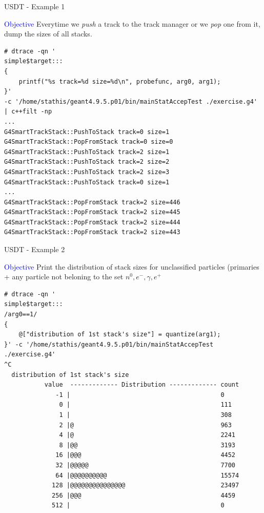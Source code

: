 \documentclass{beamer}
\begin{document}
\begin{frame}[fragile]{USDT - Example 1}
\lstset{basicstyle=\tiny\ttfamily}

\textcolor{blue}{Objective} Everytime we \textit{push} a track to the track manager or we \textit{pop} one from it,
dump the sizes of all stacks.

\lstset{frame=single, columns=flexible}
\begin{lstlisting}
# dtrace -qn '
simple$target:::
{
    printf("%s track=%d size=%d\n", probefunc, arg0, arg1);
}'
-c '/home/stathis/geant4.9.5.p01/bin/mainStatAccepTest ./exercise.g4' | c++filt -np
...
G4SmartTrackStack::PushToStack track=0 size=1
G4SmartTrackStack::PopFromStack track=0 size=0
G4SmartTrackStack::PushToStack track=2 size=1
G4SmartTrackStack::PushToStack track=2 size=2
G4SmartTrackStack::PushToStack track=2 size=3
G4SmartTrackStack::PushToStack track=0 size=1
...
G4SmartTrackStack::PopFromStack track=2 size=446
G4SmartTrackStack::PopFromStack track=2 size=445
G4SmartTrackStack::PopFromStack track=2 size=444
G4SmartTrackStack::PopFromStack track=2 size=443
\end{lstlisting}
\end{frame}

\begin{frame}[fragile]{USDT - Example 2}
\lstset{basicstyle=\tiny\ttfamily}

\textcolor{blue}{Objective} Print the distribution of stack sizes for unclassified particles
(primaries + any particle not beloning to the set ${n^0, e^-,\gamma, e^+}$

\lstset{frame=single, columns=flexible}
\begin{lstlisting}
# dtrace -qn '
simple$target:::
/arg0==1/
{
    @["distribution of 1st stack's size"] = quantize(arg1);
}' -c '/home/stathis/geant4.9.5.p01/bin/mainStatAccepTest ./exercise.g4'
^C
  distribution of 1st stack's size
           value  ------------- Distribution ------------- count
              -1 |                                         0
               0 |                                         111
               1 |                                         308
               2 |@                                        963
               4 |@                                        2241
               8 |@@                                       3193
              16 |@@@                                      4452
              32 |@@@@@                                    7700
              64 |@@@@@@@@@@                               15574
             128 |@@@@@@@@@@@@@@@                          23497
             256 |@@@                                      4459
             512 |                                         0
\end{lstlisting}
\end{frame}
\end{document}
